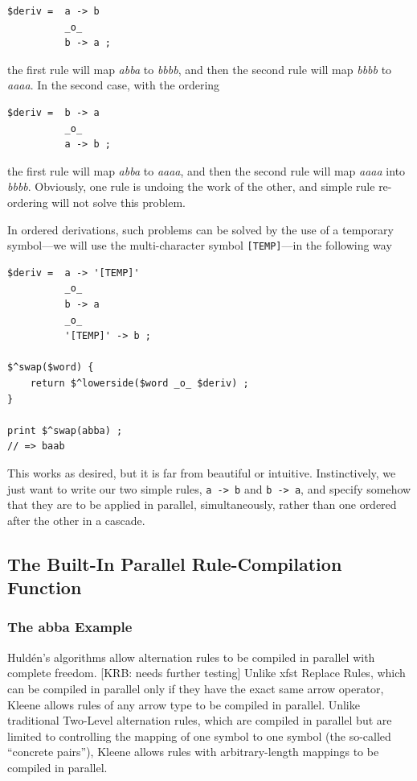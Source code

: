 \begin{Verbatim}
$deriv =  a -> b
          _o_
          b -> a ;
\end{Verbatim}

\noindent
the first rule will map \emph{abba} to \emph{bbbb}, and then the second rule will map
\emph{bbbb} to \emph{aaaa}.  In the second case, with the ordering


\begin{Verbatim}
$deriv =  b -> a
          _o_
          a -> b ;
\end{Verbatim}

\noindent
the first rule will map \emph{abba} to \emph{aaaa}, and then the second rule will map
\emph{aaaa} into \emph{bbbb}.  Obviously, one rule is undoing the work
of the other, and simple rule re-ordering will not solve this
problem.

In ordered derivations, such problems can be solved by the use of a temporary symbol---we
will use the multi-character symbol \verb![TEMP]!---in the following way


\begin{Verbatim}
$deriv =  a -> '[TEMP]'
          _o_
          b -> a
          _o_
          '[TEMP]' -> b ;

$^swap($word) {
    return $^lowerside($word _o_ $deriv) ;
}

print $^swap(abba) ;
// => baab
\end{Verbatim}

\noindent
This works as desired, but it is far from beautiful or intuitive.  
Instinctively, we just want to write our two
simple rules, \verb!a -> b! and \verb!b -> a!, and specify somehow that they are to be
applied in parallel, simultaneously, rather than one ordered after the
other in a cascade. 

\newcommand{\dollar}{\char'44}

\subsection{The Built-In Parallel Rule-Compilation Function}

\subsubsection{The abba Example}

Huld\'en's algorithms allow alternation rules to be compiled in parallel with complete
freedom. [KRB:  needs further testing]
 Unlike xfst Replace Rules, which can be compiled in parallel only if they have the exact same arrow operator,
Kleene allows rules of any arrow type to be compiled in parallel.  Unlike traditional Two-Level alternation rules, which are
compiled in parallel but are
limited to controlling the mapping of one symbol to one symbol (the so-called ``concrete pairs''), Kleene allows
rules with arbitrary-length mappings to be compiled in parallel.

